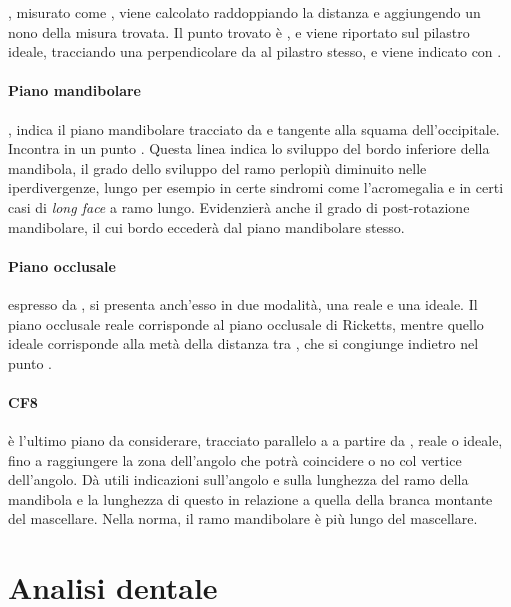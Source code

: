 , misurato come , viene calcolato raddoppiando la distanza  e aggiungendo un nono della misura trovata. Il punto trovato è , e viene riportato sul pilastro ideale, tracciando una perpendicolare da  al pilastro stesso, e viene indicato con .\\

\paragraph{Piano mandibolare} , indica il piano mandibolare tracciato da  e tangente alla squama dell'occipitale. Incontra  in un punto . Questa linea indica lo sviluppo del bordo inferiore della mandibola, il grado dello sviluppo del ramo perlopiù diminuito nelle iperdivergenze, lungo per esempio in certe sindromi come l'acromegalia e in certi casi di \emph{long face} a ramo lungo. Evidenzierà anche il grado di post-rotazione mandibolare, il cui bordo eccederà dal piano mandibolare stesso.

\paragraph{Piano occlusale} espresso da , si presenta anch'esso in due modalità, una reale e una ideale. Il piano occlusale reale corrisponde al piano occlusale di Ricketts, mentre quello ideale corrisponde alla metà della distanza tra , che si congiunge indietro nel punto .\\

\paragraph{CF8} è l'ultimo piano da considerare, tracciato parallelo a  a partire da , reale o ideale, fino a raggiungere la zona dell'angolo che potrà coincidere o no col vertice dell'angolo. Dà utili indicazioni sull'angolo e sulla lunghezza del ramo della mandibola e la lunghezza di questo in relazione a quella della branca montante del mascellare. Nella norma, il ramo mandibolare è più lungo del mascellare.


\section{Analisi dentale}
